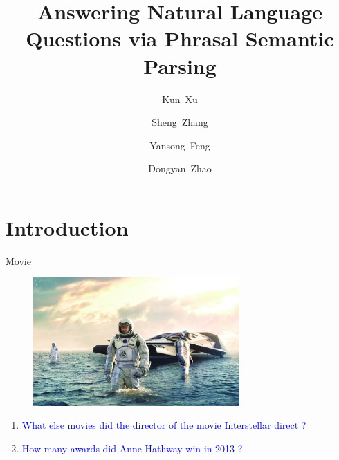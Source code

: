 \documentclass{beamer}
\title[Answering Natural Language Questions via Phrasal Semantic Parsing] 
{%
  Answering Natural Language Questions via Phrasal Semantic Parsing %
}
\author[Gramm, Hartman, Nierhoff, Sharan, Tantau]
{
  Kun~Xu \and
  Sheng~Zhang \and
  Yansong~Feng \and
  Dongyan~Zhao
}
\institute
{
   Peking University
}
\begin{document}
\begin{frame}
  \titlepage
\end{frame}



\section{Introduction}

\begin{frame}{Movie}
	\begin{figure}
		\centering\includegraphics[width=0.7\textwidth]{introduction/interstellar.jpg}
	\end{figure}
	\begin{enumerate}
		\pause
		\item \textcolor{blue}{What else movies did the director of the movie Interstellar direct ?}
		\pause
		\item \textcolor{blue}{How many awards did Anne Hathway win in 2013 ?}
	\end{enumerate}
\end{frame}
\end{document}
